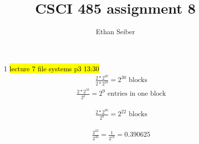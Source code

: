 \documentclass[12pt]{article}
\author{Ethan Seiber}
\title{CSCI 485 assignment 8}
\begin{document}
\maketitle

\begin{enumerate}
\item[1] \hl{lecture 7 file systems p3 13:30}
	\begin{align*}%
	\frac{2*2^{40}}{2*2^{10}}= 2^{30}\text{ blocks}
	\end{align*}
	\begin{align*}%
	\frac{2*2^{10}}{2^2} = 2^9\text{ entries in one block}
	\end{align*}
	
	\begin{align*}%
	\frac{2*2^{30}}{2^9} = 2^{22}\text{ blocks}
	\end{align*}
	
	\begin{align*}
	\frac{2^{22}}{2^{30}} = \frac{1}{2^{18}} = 0.390625%
	\end{align*}
\end{enumerate}
\end{document}
